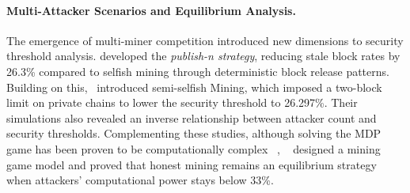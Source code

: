 

\paragraph{Multi-Attacker Scenarios and Equilibrium Analysis.}
The emergence of multi-miner competition introduced new dimensions to security threshold analysis. 
\cite{liu2018strategy} developed the \textit{publish-n strategy}, reducing stale block rates by 26.3\% compared to selfish mining through deterministic block release patterns. 
Building on this,~\cite{marmolejo2019competing} introduced semi-selfish Mining, which imposed a two-block limit on private chains to lower the security threshold to 26.297\%. Their simulations also revealed an inverse relationship between attacker count and security thresholds. 
Complementing these studies, although solving the MDP game has been proven to be computationally complex ~\cite{deng2023complexity}, ~\cite{zhang2022insightful} designed a mining game model and proved that honest mining remains an equilibrium strategy when attackers' computational power stays below 33\%.

